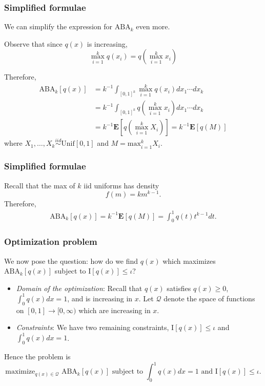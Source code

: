 \documentclass{beamer}
\newcommand{\E}{\textbf{E}}
\begin{document}
\begin{frame}
\frametitle{Simplified formulae}

We can simplify the expression for $\text{ABA}_k$ even more.

Observe that since $q(x)$ is increasing,
\[
\max_{i=1}^k q(x_i) = q\left(\max_{i=1}^k x_i\right)
\]

Therefore,
\begin{align*}
\text{ABA}_k[q(x)] &= k^{-1}\int_{[0, 1]^k} \max_{i=1}^k q(x_i) dx_1 \cdots dx_k
\\&= k^{-1}\int_{[0, 1]^k} q\left(\max_{i=1}^k x_i\right) dx_1 \cdots dx_k
\\&= k^{-1}\E\left[q\left(\max_{i=1}^k X_i\right)\right] = k^{-1}\E[q(M)]
\end{align*}
where $X_1,\hdots, X_k \stackrel{iid}{\sim} \text{Unif}[0,1]$ and $M = \text{max}_{i=1}^k X_i$.

\end{frame}

\begin{frame}
\frametitle{Simplified formulae}

Recall that the max of $k$ iid uniforms has density
\[
f(m) = km^{k-1}.
\]
Therefore,
\begin{align*}
\text{ABA}_k[q(x)] =  k^{-1}\E[q(M)] = \int_0^1 q(t) t^{k-1} dt.
\end{align*}

\end{frame}


\begin{frame}
\frametitle{Optimization problem}
We now pose the question: how do we find $q(x)$ which maximizes $\text{ABA}_k[q(x)]$ subject to $\text{I}[q(x)] \leq \iota$?

\begin{itemize}
\item \emph{Domain of the optimization}: Recall that $q(x)$ satisfies $q(x) \geq 0$, $\int_0^1 q(x) dx = 1$, and is increasing in $x$.
Let $\mathcal{Q}$ denote the space of functions on $[0,1] \to [0,\infty)$ which are increasing in $x$.
\item \emph{Constraints}: We have two remaining constraints, $\text{I}[q(x)] \leq \iota$ and $\int_0^1 q(x) dx = 1$.
\end{itemize}

Hence the problem is
\[
\text{maximize}_{q(x) \in \mathcal{Q}}\text{ ABA}_k[q(x)]\text{ subject to }\int_0^1 q(x) dx = 1\text{ and }\text{I}[q(x)] \leq \iota.
\]
\end{frame}
\end{document}
